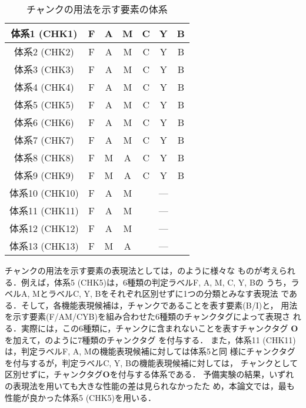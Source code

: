 \documentclass[japanese]{jnlp_1.2d}
\newcommand{\tabref}[1]{}
\newcommand{\figref}[1]{}
\begin{document}
\begin{table}
  \begin{center}
    \caption{チャンクの用法を示す要素の体系}
    \label{tab:tag}
    \begin{tabular}{c||c|c|c|c|c|c}
      \hline
      体系1 (CHK1) & F & A & M & C & Y & B \\
      \hline
      体系2 (CHK2) & \multicolumn{1}{c}{F} & \multicolumn{1}{c}{A} & \multicolumn{1}{c|}{M}
		  & C & Y & B \\
      \hline
      体系3 (CHK3) & \multicolumn{1}{c}{F} & \multicolumn{1}{c}{A} & \multicolumn{1}{c|}{M} &
		      \multicolumn{1}{c}{C} &\multicolumn{1}{c}{Y} & \multicolumn{1}{c}{B} \\
      \hline
      体系4 (CHK4) & F & \multicolumn{1}{c}{A} & \multicolumn{1}{c}{M}
		  & \multicolumn{1}{c}{C} & \multicolumn{1}{c}{Y} & \multicolumn{1}{c}{B} \\
      \hline
      体系5 (CHK5) & F & \multicolumn{1}{c}{A} & \multicolumn{1}{c|}{M}
		  & \multicolumn{1}{c}{C} & \multicolumn{1}{c}{Y} & \multicolumn{1}{c}{B} \\
      \hline
      体系6 (CHK6) & F & \multicolumn{1}{c}{A} & \multicolumn{1}{c|}{M} & C & Y & B \\
      \hline
      体系7 (CHK7) & F & A & M & \multicolumn{1}{|c}{C} & \multicolumn{1}{c}{Y} & B \\
      \hline
      体系8 (CHK8) & \multicolumn{1}{c}{F} & M & A & \multicolumn{1}{|c}{C} & \multicolumn{1}{c}{Y} & B \\
      \hline
      体系9 (CHK9) & \multicolumn{1}{c}{F} & M & A & C & Y & B \\
      \hline
      体系10 (CHK10) & F & A & M & \multicolumn{3}{c}{---} \\
      \hline
      体系11 (CHK11) & F & \multicolumn{1}{c}{A} & M & \multicolumn{3}{c}{---} \\
      \hline
      体系12 (CHK12) & \multicolumn{1}{c}{F} & \multicolumn{1}{c}{A} & M & \multicolumn{3}{c}{---} \\
      \hline
      体系13 (CHK13) & \multicolumn{1}{c}{F} & M & A & \multicolumn{3}{c}{---} \\
      \hline
    \end{tabular}
  \end{center}
\end{table}

チャンクの用法を示す要素の表現法としては，\tabref{tab:tag}のように様々な
ものが考えられる．例えば，体系5 (CHK5)は，6種類の判定ラベルF, A, M, C, Y, Bの
うち，ラベルA, MとラベルC, Y, Bをそれぞれ区別せずに1つの分類とみなす表現法
である．そして，各機能表現候補は，チャンクであることを表す要素(B/I)と，
用法を示す要素(F/AM/CYB)を組み合わせた6種類のチャンクタグによって表現さ
れる．実際には，この6種類に，チャンクに含まれないことを表すチャンクタグ
{\bfseries O}を加えて，\figref{fig:chunktag}のように7種類のチャンクタグ
を付与する．
また，体系11 (CHK11)は，判定ラベルF, A, Mの機能表現候補に対しては体系5と同
様にチャンクタグを付与するが，判定ラベルC, Y, Bの機能表現候補に対しては，
チャンクとして区別せずに，チャンクタグ{\bfseries O}を付与する体系である．
予備実験の結果，いずれの表現法を用いても大きな性能の差は見られなかったた
め，本論文では，最も性能が良かった体系5 (CHK5)を用いる．
\end{document}
